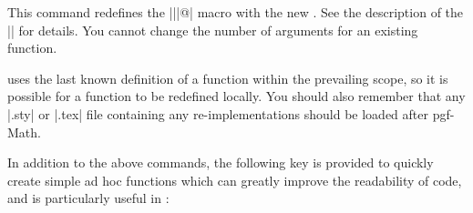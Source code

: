 \begin{command}{\pgfmathredeclarefunction{}}

  This command redefines the |\pgfmath||@| macro
  with the new . See the description of the
  |\pgfmathdeclarefunction| for details. You cannot change the number
  of arguments for an existing function.

\end{command}

  \pgfname{} uses the last known definition of a function within the
  prevailing scope, so it is possible for a function to be redefined
  locally. You should also remember that any |.sty| or |.tex| file
  containing any re-implementations should be loaded after pgf-Math.

  In addition to the above commands, the following key is provided to
  quickly create simple ad hoc functions which can greatly improve
  the readability of code, and is particularly useful in \tikzname{}:

